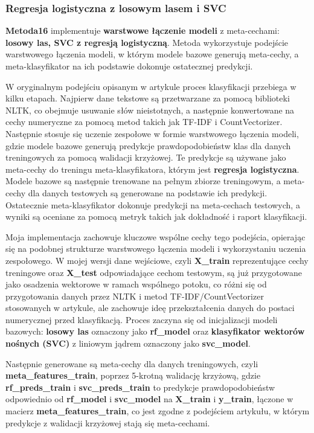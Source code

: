 \subsubsection{Regresja logistyczna z losowym lasem i SVC}
\textbf{Metoda16} implementuje \textbf{warstwowe łączenie modeli} z meta-cechami: \textbf{losowy las, SVC z regresją logistyczną}. Metoda wykorzystuje podejście warstwowego łączenia modeli, w którym modele bazowe generują meta-cechy, a meta-klasyfikator na ich podstawie dokonuje ostatecznej predykcji.

W oryginalnym podejściu opisanym w artykule \cite{metoda16} proces klasyfikacji przebiega w kilku etapach. Najpierw dane tekstowe są przetwarzane za pomocą biblioteki NLTK, co obejmuje usuwanie słów nieistotnych, a następnie konwertowane na cechy numeryczne za pomocą metod takich jak TF-IDF i CountVectorizer. Następnie stosuje się uczenie zespołowe w formie warstwowego łączenia modeli, gdzie modele bazowe generują predykcje prawdopodobieństw klas dla danych treningowych za pomocą walidacji krzyżowej. Te predykcje są używane jako meta-cechy do treningu meta-klasyfikatora, którym jest \textbf{regresja logistyczna}. Modele bazowe są następnie trenowane na pełnym zbiorze treningowym, a meta-cechy dla danych testowych są generowane na podstawie ich predykcji. Ostatecznie meta-klasyfikator dokonuje predykcji na meta-cechach testowych, a wyniki są oceniane za pomocą metryk takich jak dokładność i raport klasyfikacji.

Moja implementacja zachowuje kluczowe wspólne cechy tego podejścia, opierając się na podobnej strukturze warstwowego łączenia modeli i wykorzystaniu uczenia zespołowego. W mojej wersji dane wejściowe, czyli \textbf{X\_train} reprezentujące cechy treningowe oraz \textbf{X\_test} odpowiadające cechom testowym, są już przygotowane jako osadzenia wektorowe w ramach wspólnego potoku, co różni się od przygotowania danych przez NLTK i metod TF-IDF/CountVectorizer stosowanych w artykule, ale zachowuje ideę przekształcenia danych do postaci numerycznej przed klasyfikacją. Proces zaczyna się od inicjalizacji modeli bazowych: \textbf{losowy las} oznaczony jako \textbf{rf\_model} oraz \textbf{klasyfikator wektorów nośnych (SVC)} z liniowym jądrem oznaczony jako \textbf{svc\_model}.

Następnie generowane są meta-cechy dla danych treningowych, czyli \textbf{meta\_features\_train}, poprzez 5-krotną walidację krzyżową, gdzie \textbf{rf\_preds\_train} i \textbf{svc\_preds\_train} to predykcje prawdopodobieństw odpowiednio od \textbf{rf\_model} i \textbf{svc\_model} na \textbf{X\_train} i \textbf{y\_train}, łączone w macierz \textbf{meta\_features\_train}, co jest zgodne z podejściem artykułu, w którym predykcje z walidacji krzyżowej stają się meta-cechami. 

